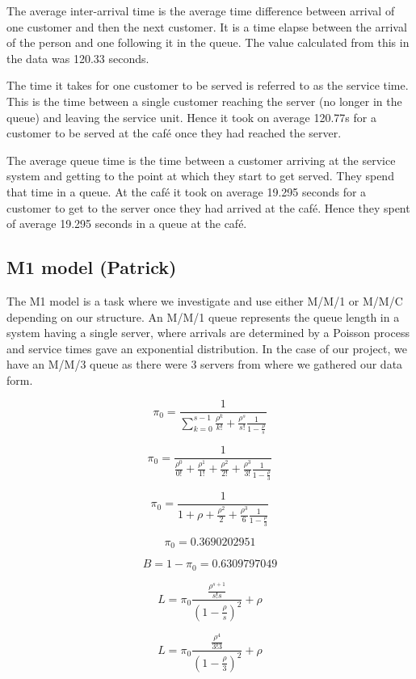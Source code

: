 \documentclass{article}
\begin{document}
The average inter-arrival time is the average time difference between arrival of one customer and then the next customer. It is a time elapse between the arrival of the person and one following it in the queue. The value calculated from this in the data was 120.33 seconds.

The time it takes for one customer to be served is referred to as the service time. This is the time between a single customer reaching the server (no longer in the queue) and leaving the service unit. Hence it took on average 120.77s for a customer to be served at the café once they had reached the server.

The average queue time is the time between a customer arriving at the service system and getting to the point at which they start to get served. They spend that time in a queue. At the café it took on average 19.295 seconds for a customer to get to the server once they had arrived at the café. Hence they spent of average 19.295 seconds in a queue at the café.




\subsection{M1 model (Patrick)}

The M1 model is a task where we investigate and use either M/M/1 or M/M/C depending on our structure. An M/M/1 queue represents the queue length in a system having a single server, where arrivals are determined by a Poisson process and service times gave an exponential distribution. In the case of our project, we have an M/M/3 queue as there were 3 servers from where we gathered our data form.

$$
\pi_{0} = \frac{1}{\sum_{k=0}^{s-1}{\frac{\rho^k}{k!}} + \frac{\rho^s}{s!}\frac{1}{1-\frac{\rho}{s}}}
$$

$$
\pi_{0} = \frac{1}{\frac{\rho^0}{0!} + \frac{\rho^1}{1!} + \frac{\rho^2}{2!} + \frac{\rho^3}{3!}\frac{1}{1-\frac{\rho}{3}}}
$$

$$
\pi_{0} = \frac{1}{1 + \rho + \frac{\rho^2}{2} + \frac{\rho^3}{6}\frac{1}{1-\frac{\rho}{3}}}
$$

$$
\pi_{0} = 0.3690202951
$$

$$
B = 1-\pi_{0} = 0.6309797049
$$

$$
L = \pi_{0}\frac{\frac{\rho^{s+1}}{s!s}}{(1-\frac{\rho}{s})^2}+\rho
$$

$$
L = \pi_{0}\frac{\frac{\rho^{4}}{3!3}}{(1-\frac{\rho}{3})^2}+\rho
$$
\end{document}
